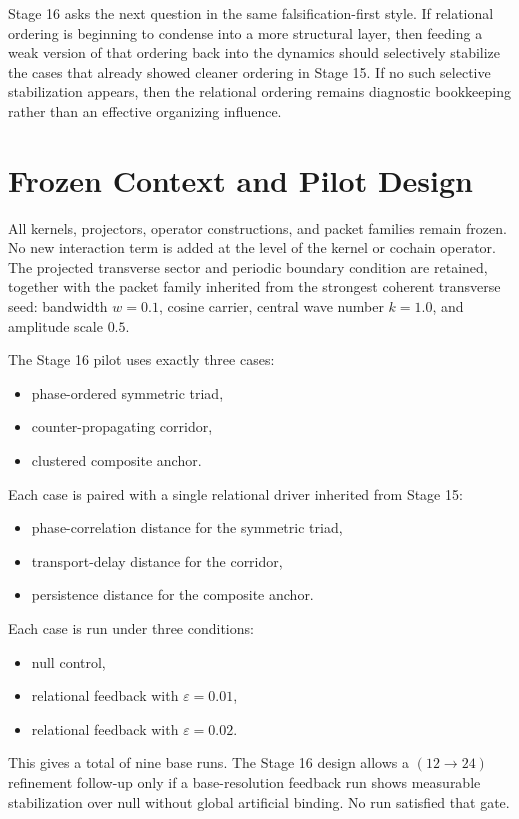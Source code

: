 \documentclass[11pt]{article}
\begin{document}
Stage 16 asks the next question in the same falsification-first style. If relational ordering is beginning to condense into a more structural layer, then feeding a weak version of that ordering back into the dynamics should selectively stabilize the cases that already showed cleaner ordering in Stage 15. If no such selective stabilization appears, then the relational ordering remains diagnostic bookkeeping rather than an effective organizing influence.

\section{Frozen Context and Pilot Design}

All kernels, projectors, operator constructions, and packet families remain frozen. No new interaction term is added at the level of the kernel or cochain operator. The projected transverse sector and periodic boundary condition are retained, together with the packet family inherited from the strongest coherent transverse seed: bandwidth $w=0.1$, cosine carrier, central wave number $k=1.0$, and amplitude scale $0.5$.

The Stage 16 pilot uses exactly three cases:
\begin{itemize}
\item phase-ordered symmetric triad,
\item counter-propagating corridor,
\item clustered composite anchor.
\end{itemize}

Each case is paired with a single relational driver inherited from Stage 15:
\begin{itemize}
\item phase-correlation distance for the symmetric triad,
\item transport-delay distance for the corridor,
\item persistence distance for the composite anchor.
\end{itemize}

Each case is run under three conditions:
\begin{itemize}
\item null control,
\item relational feedback with $\varepsilon=0.01$,
\item relational feedback with $\varepsilon=0.02$.
\end{itemize}

This gives a total of nine base runs. The Stage 16 design allows a $(12 \rightarrow 24)$ refinement follow-up only if a base-resolution feedback run shows measurable stabilization over null without global artificial binding. No run satisfied that gate.
\end{document}

